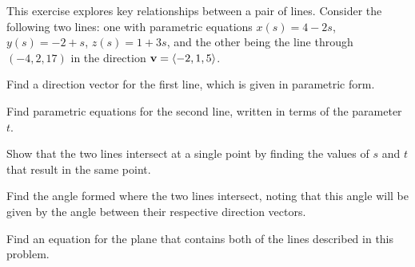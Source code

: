 \begin{exercises}
\item \label{Ez:9.5.2}   This exercise explores key relationships between a pair of lines.  Consider the following two lines:  one with parametric equations $x(s) = 4-2s$, $y(s) = -2 + s$, $z(s) = 1 + 3s$, and the other being the line through $(-4, 2, 17)$ in the direction $\mathbf{v} = \langle -2, 1, 5 \rangle$.


  \ba
  	\item  Find a direction vector for the first line, which is given in parametric form.
	\item  Find parametric equations for the second line, written in terms of the parameter $t$.
	\item  Show that the two lines intersect at a single point by finding the values of $s$ and $t$ that result in the same point.
	\item  Find the angle formed where the two lines intersect, noting that this angle will be given by the angle between their respective direction vectors.  
 	\item  Find an equation for the plane that contains both of the lines described in this problem. 
  \ea 



\end{exercises}
